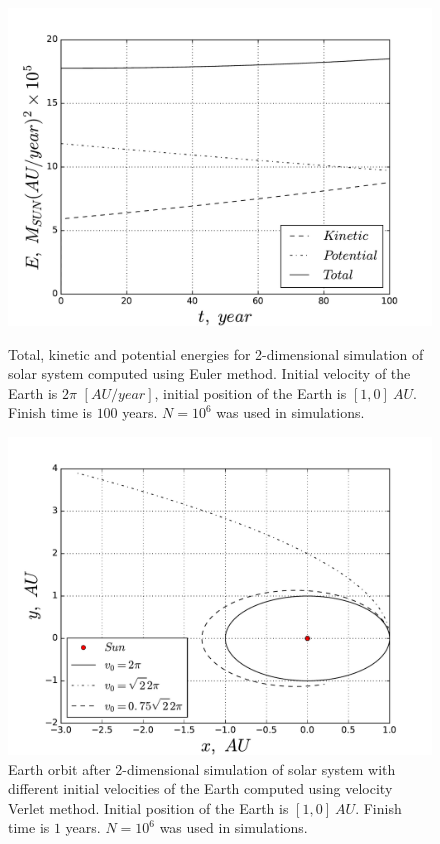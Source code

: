 \documentclass[10pt]{article}
\begin{document}
\begin{figure}[ht]
  \begin{center}
    \includegraphics[scale=0.5]{euler_energy}
    \caption {Total, kinetic and potential energies for 2-dimensional simulation of solar system computed using Euler method.  Initial velocity of the Earth is $2\pi$ $[AU/year]$, initial position of the Earth is $[1,0]\ AU$. Finish time is $100$ years. $N=10^6$ was used in simulations. }
    \label{fig:euler_energy}
  \end{center}

\vspace*{\floatsep}

  \begin{center}
    \includegraphics[scale=0.5]{escape_earth}
    \caption {Earth orbit after 2-dimensional simulation of solar system with different initial velocities of the Earth computed using velocity Verlet method. Initial position of the Earth is $[1,0]\ AU$. Finish time is $1$ years. $N=10^6$ was used in simulations. }
    \label{fig:escape}
  \end{center}
\end{figure}
\clearpage
\end{document}
